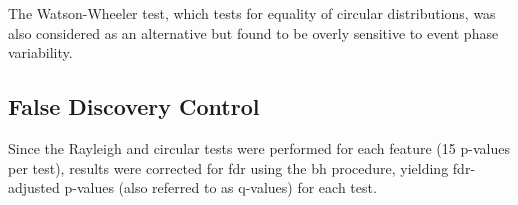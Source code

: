 The Watson-Wheeler test, which tests for equality of circular distributions, was also considered as an alternative but found to be overly sensitive to event phase variability.

\subsection{False Discovery Control} \label{subsec:fdr}
Since the Rayleigh and circular tests were performed for each feature (15 p-values per test), results were corrected for \gls{fdr} using the \gls{bh} procedure, yielding \gls{fdr}-adjusted p-values (also referred to as q-values) for each test.
